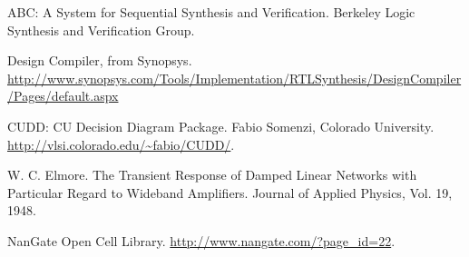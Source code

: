 \documentclass[12pt]{article}
\begin{document}
\newpage
\begin{thebibliography}{9}

ABC: A System for Sequential Synthesis and Verification. Berkeley Logic Synthesis and Verification Group.
 
Design Compiler, from Synopsys. \url{http://www.synopsys.com/Tools/Implementation/RTLSynthesis/DesignCompiler/Pages/default.aspx}

CUDD: CU Decision Diagram Package. Fabio Somenzi, Colorado University. \url{http://vlsi.colorado.edu/~fabio/CUDD/}.

W. C. Elmore. The Transient Response of Damped Linear Networks with Particular Regard to Wideband Amplifiers. Journal of Applied Physics, Vol. 19, 1948.

NanGate Open Cell Library. \url{http://www.nangate.com/?page_id=22}.
\end{thebibliography}

\newpage
\listoffigures

\newpage
\listoftables

%
\end{document}
